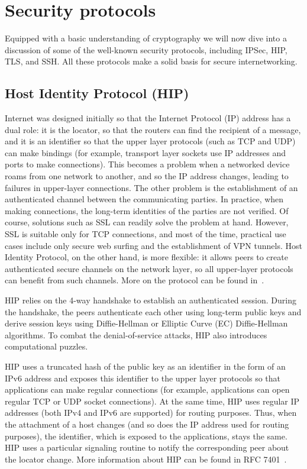 \section{Security protocols}

Equipped with a basic understanding of cryptography we will now dive into a discussion of some 
of the well-known security protocols, including IPSec, HIP, TLS, and SSH. All these protocols
make a solid basis for secure internetworking.

\subsection{Host Identity Protocol (HIP)}

Internet was designed initially so that the Internet Protocol (IP) address has a dual role: it 
is the locator, so that the routers can find the recipient of a message, and it is an identifier 
so that the upper layer protocols (such as TCP and UDP) can make bindings (for example, transport 
layer sockets use IP addresses and ports to make connections). This becomes a problem when a networked 
device roams from one network to another, and so the IP address changes, leading to failures in 
upper-layer connections. The other problem is the establishment of an authenticated channel between 
the communicating parties. In practice, when making connections, the long-term identities of the parties 
are not verified. Of course, solutions such as SSL can readily solve the problem at hand. However, SSL 
is suitable only for TCP connections, and most of the time, practical use cases include only secure web 
surfing and the establishment of VPN tunnels. Host Identity Protocol, on the other hand, is more flexible: 
it allows peers to create authenticated secure channels on the network layer, so all upper-layer protocols 
can benefit from such channels. More on the protocol can be found in~\cite{gurtov:hip}.

HIP relies on the 4-way handshake to establish an authenticated session. During the handshake, the 
peers authenticate each other using long-term public keys and derive session keys using Diffie-Hellman 
or Elliptic Curve (EC) Diffie-Hellman algorithms. To combat the denial-of-service attacks, HIP also 
introduces computational puzzles. 

HIP uses a truncated hash of the public key as an identifier in the form of an IPv6 address and 
exposes this identifier to the upper layer protocols so that applications can make regular 
connections (for example, applications can open regular TCP or UDP socket connections). At the 
same time, HIP uses regular IP addresses (both IPv4 and IPv6 are supported) for routing purposes. 
Thus, when the attachment of a host changes (and so does the IP address used for routing purposes), 
the identifier, which is exposed to the applications, stays the same. HIP uses a particular 
signaling routine to notify the corresponding peer about the locator change. More information 
about HIP can be found in RFC 7401~\cite{rfc7401}. 

